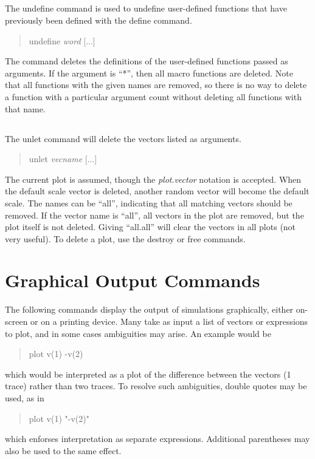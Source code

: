 \subsection{}


The {\cb undefine} command is used to undefine user-defined functions
that have previously been defined with the {\cb define} command.
\begin{quote}\vt
undefine {\it word} [...]
\end{quote}
The command deletes the definitions of the user-defined functions
passed as arguments.  If the argument is ``*'', then all macro
functions are deleted.  Note that all functions with the given names
are removed, so there is no way to delete a function with a particular
argument count without deleting all functions with that name.

\subsection{}


The {\cb unlet} command will delete the vectors listed as arguments. 
\begin{quote}\vt
unlet {\it vecname} [...]
\end{quote}
The current plot is assumed, though the {\it plot\/}.{\it vector}
notation is accepted.  When the default scale vector is deleted,
another random vector will become the default scale.  The names can be
``{\vt all}'', indicating that all matching vectors should be removed. 
If the vector name is ``{\vt all}'', all vectors in the plot are
removed, but the plot itself is not deleted.  Giving ``{\vt all.all}''
will clear the vectors in all plots (not very useful).  To delete a
plot, use the {\cb destroy} or {\cb free} commands.


\section{Graphical Output Commands}
\label{grout}


The following commands display the output of simulations graphically,
either on-screen or on a printing device.  Many take as input a list of
vectors or expressions to plot, and in some cases ambiguities may arise.
An example would be
\begin{quote}
{\vt plot v(1) -v(2)}
\end{quote}
which would be interpreted as a plot of the difference between the 
vectors (1 trace) rather than two traces.  To resolve such ambiguities, 
double quotes may be used, as in 
\begin{quote}
{\vt plot v(1) "-v(2)"}
\end{quote}
which enforses interpretation as separate expressions.  Additional
parentheses may also be used to the same effect.


